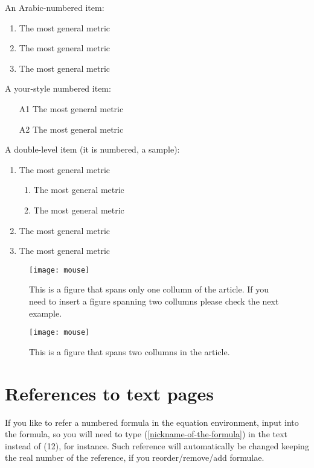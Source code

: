 \documentclass[12pt]{article}
\begin{document}
An Arabic-numbered item:
\begin{enumerate}
\item The most general metric
\item The most general metric
\item The most general metric
\end{enumerate}


A your-style numbered item:
\begin{itemize}
\item [A1] The most general metric
\item [A2] The most general metric
\end{itemize}

A double-level item (it is numbered, a sample):
\begin{enumerate}
\item The most general metric
  \begin{enumerate}
  \item The most general metric
  \item The most general metric
  \end{enumerate}
\item The most general metric
\item The most general metric
\end{enumerate}

\begin{figure}
\centering
\texttt{[image: mouse]}
\caption{This is a figure that spans only one collumn of the article. If you need to insert a figure spanning two collumns please check the next example.}
\end{figure}

\begin{figure*}
\centering
\texttt{[image: mouse]}
\caption{This is a figure that spans two collumns in the article.}
\end{figure*}

\section*{References to text pages}

If you like to refer a numbered formula in the {equation} environment, input \label{nickname-of-the-formula} into the formula, so you will need to type (\ref{nickname-of-the-formula}) in the text instead of (12), for instance. Such reference will automatically be changed keeping the real number of the reference, if you reorder/remove/add formulae.
\end{document}
